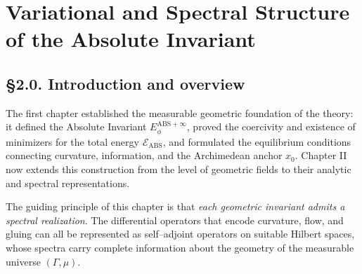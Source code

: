 
\chapter{Variational and Spectral Structure of the Absolute Invariant}
\label{ch:2}

\section*{§2.0. Introduction and overview}

The first chapter established the measurable geometric foundation of the theory:
it defined the Absolute Invariant $E_\phi^{\mathrm{ABS+}\infty}$, proved the coercivity and existence of minimizers for the total energy $\mathcal{E}_{\mathrm{ABS}}$, and formulated the equilibrium conditions connecting curvature, information, and the Archimedean anchor $x_0$.  
Chapter II now extends this construction from the level of geometric fields to their analytic and spectral representations.

The guiding principle of this chapter is that \emph{each geometric invariant admits a spectral realization}.
The differential operators that encode curvature, flow, and gluing can all be represented as self–adjoint operators on suitable Hilbert spaces, whose spectra carry complete information about the geometry of the measurable universe $(\Gamma,\mu)$.

